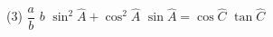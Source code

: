 %
%
    \begin{tasks}[label=\textbf{\alph*)}](3)
        \task $\dfrac{a}{b}$
        \task $b$
        \task $\sin^2 \widehat{A} + \cos^2 \widehat{A}$
        \task $\sin \widehat{A} = \cos\widehat{C}$
        \task $\tan\widehat{C}$
    \end{tasks}
